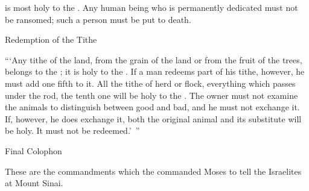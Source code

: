 {is
most
holy
to the
{}.
Any
human being who is permanently dedicated
must not be ransomed;
such a person
must
be put to death.
\par }{\SH Redemption of the Tithe
\par }{\PP {}“‘Any
tithe
of the land,
from the grain
of the land
or from the fruit
of the trees,
belongs to the
{}; it is
holy
to the
{}.
If
a man
redeems
part of his tithe,
however, he must add
one fifth to it.
All
the tithe
of herd
or flock,
everything
which
passes
under
the rod,
the tenth
one will be
holy
to the
{}.
The owner must not
examine
the animals to distinguish between
good
and bad,
and he must not
exchange
it. If,
however, he does exchange
it, both the original animal and its substitute
will be
holy.
It must not
be redeemed.’ ”
\par }{\SH Final Colophon
\par }{\PP {}These
are the commandments
which
the {}
commanded
Moses
to tell
the Israelites
at Mount
Sinai.
\par }